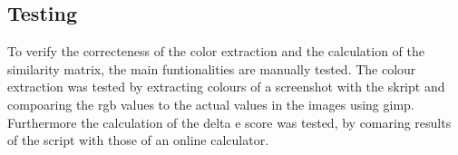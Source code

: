 


\subsection{Testing}
\label{testing}
To verify the correcteness of the color extraction and the calculation of the similarity matrix, the main funtionalities are manually tested. The colour extraction was tested by extracting colours of a screenshot with the skript and compoaring the rgb values to the actual values in the images using gimp. Furthermore the calculation of the delta e score was tested, by comaring results of the script with those of an online calculator. \\

